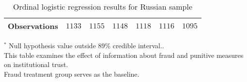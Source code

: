 \begin{table}[h]
\begin{center}
\begin{threeparttable}
\begin{tabular}{l c c c c c c}
\hline
Observations        & $1133$            & $1155$            & $1148$            & $1118$            & $1116$            & $1095$            \\
\hline
\end{tabular}
\begin{tablenotes}[flushleft]
\scriptsize{$^*$ Null hypothesis value outside 89\% credible interval..  \\
This table examines the effect of information about fraud
                      and punitive measures on institutional trust. \\
Fraud treatment group serves as the baseline.}
\end{tablenotes}
\end{threeparttable}
\caption{Ordinal logistic regression results for Russian sample}
\label{table:coefficients}
\end{center}
\end{table}
